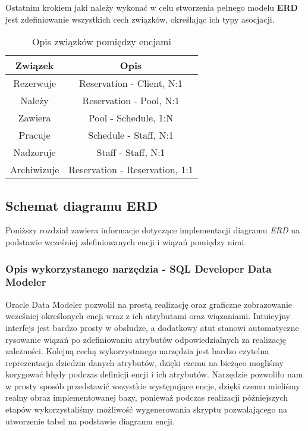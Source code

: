 \documentclass[a4paper]{article}
\begin{document}
Ostatnim krokiem jaki należy wykonać w celu stworzenia pełnego modelu \textbf{ERD} jest zdefiniowanie wszystkich cech związków, określając ich typy asocjacji.

\begin{table}[htbp]
\centering
\begin{tabular}{|c|c|}
\hline
\textbf{Związek} & \textbf{Opis}             \\ \hline
Rezerwuje        & Reservation - Client, N:1 \\ \hline
Należy           & Reservation - Pool, N:1   \\ \hline
Zawiera          & Pool - Schedule, 1:N         \\ \hline
Pracuje          & Schedule - Staff, N:1     \\ \hline
Nadzoruje        & Staff - Staff, N:1        \\ \hline
Archiwizuje      & Reservation - Reservation, 1:1 \\ \hline
\end{tabular}
\caption{Opis związków pomiędzy encjami}
\end{table}

\subsection{Schemat diagramu \textbf{ERD}}

Poniższy rozdział zawiera informacje dotyczące implementacji diagramu \textit{ERD} na podstawie wcześniej zdefiniowanych encji i wiązań pomiędzy nimi.

\subsubsection{Opis wykorzystanego narzędzia - SQL Developer Data Modeler}

Oracle Data Modeler pozwolił na prostą realizację oraz graficzne zobrazowanie wcześniej określonych encji wraz z ich atrybutami oraz wiązaniami. Intuicyjny interfejs jest bardzo prosty w obsłudze, a dodatkowy atut stanowi automatyczne rysowanie wiązań po zdefiniowaniu atrybutów odpowiedzialnych za realizację zależności. Kolejną cechą wykorzystanego narzędzia jest bardzo czytelna reprezentacja dziedzin danych atrybutów, dzięki czemu na bieżąco mogliśmy korygować błędy podczas definicji encji i ich atrybutów. Narzędzie pozwoliło nam w prosty sposób przedstawić wszystkie występujące encje, dzięki czemu mieliśmy realny obraz implementowanej bazy, ponieważ podczas realizacji późniejszych etapów wykorzystaliśmy możliwość wygenerowania skryptu pozwalającego na utworzenie tabel na podstawie diagramu encji.
\end{document}
